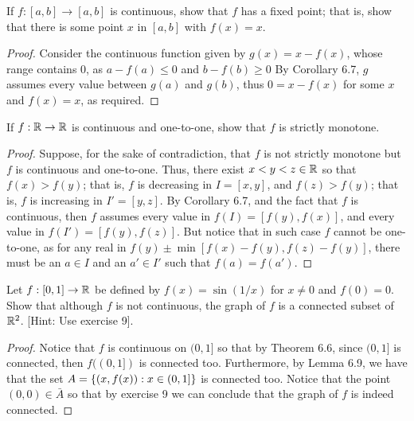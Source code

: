 \begin{exercise}{13}
If $f:[a,b]\to[a,b]$ is continuous, show that $f$ has a fixed point; that is, show that there is some point $x$ in $[a,b]$ with $f(x)=x$.
\end{exercise}
\begin{proof}
Consider the continuous function given by $g(x)=x-f(x)$, whose range contains 0, as $a-f(a)\leq 0$ and $b-f(b)\geq 0$
By Corollary 6.7, $g$ assumes every value between $g(a)$ and $g(b)$, thus $0=x-f(x)$ for some $x$ and $f(x)=x$, as required.
\end{proof} 

\begin{exercise}{16}
If $f:\mathbb{R}\to\mathbb{R}$ is continuous and one-to-one, show that $f$ is strictly monotone.
\end{exercise}
\begin{proof}
Suppose, for the sake of contradiction, that $f$ is not strictly monotone but $f$ is continuous and one-to-one.
Thus, there exist $x<y<z\in\mathbb{R}$ so that $f(x)>f(y)$; 
that is, $f$ is decreasing in $I=[x,y]$, and $f(z)>f(y)$;
that is, $f$ is increasing in $I'=[y,z]$.
By Corollary 6.7, and the fact that $f$ is continuous, then $f$ assumes every value in $f(I)=[f(y),f(x)]$, and every value in $f(I')=[f(y),f(z)]$.
But notice that in such case $f$ cannot be one-to-one, as for any real in $f(y)\pm\min[f(x)-f(y), f(z)-f(y)]$, there must be an $a\in I$ and an $a'\in I'$ such that $f(a)=f(a')$.
\end{proof} 

\begin{exercise}{26}
Let $f:[0,1]\to\mathbb{R}$ be defined by $f(x)=\sin(1/x)$ for $x\neq 0$ and $f(0)=0$.
Show that although $f$ is not continuous, the graph of $f$ is a connected subset of $\mathbb{R}^2$.
[Hint: Use exercise 9].
\end{exercise}
\begin{proof}
Notice that $f$ is continuous on $(0,1]$ so that by Theorem 6.6, since $(0,1]$ is connected, then $f((0,1])$ is connected too.
Furthermore, by Lemma 6.9, we have that the set $A=\{(x,f(x)): x\in (0,1]\}$ is connected too.
Notice that the point $(0,0)\in\bar{A}$ so that by exercise 9 we can conclude that the graph of $f$ is indeed connected.
\end{proof} 

